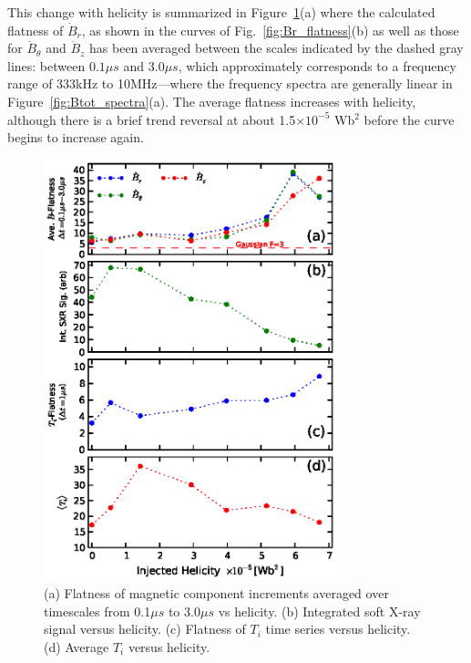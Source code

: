 \documentclass[aps,prl,amsmath,amssymb,reprint,superscriptaddress]{revtex4-1} %
\begin{document}
This change with helicity is summarized in Figure~\ref{fig:flatness_scaling}(a) where the calculated flatness of $\dot{B}_{r}$, as shown in the curves of Fig.~\ref{fig:Br_flatness}(b) as well as those for $\dot{B}_{\theta}$ and $\dot{B}_{z}$ has been averaged between the scales indicated by the dashed gray lines: between $0.1\mu s$ and $3.0\mu s$, which approximately corresponds to a frequency range of 333kHz to 10MHz---where the frequency spectra are generally linear in Figure~\ref{fig:Btot_spectra}(a). The average flatness increases with helicity, although there is a brief trend reversal at about 1.5$\times 10^{-5}$ Wb$^{2}$ before the curve begins to increase again.


\begin{figure}[!htbp]
\centerline{
\includegraphics[width=8.5cm]{figure4.eps}}
\caption{\label{fig:flatness_scaling} (a) Flatness of magnetic component increments averaged over timescales from 0.1$\mu s$ to 3.0$\mu s$ vs helicity. (b) Integrated soft X-ray signal versus helicity. (c) Flatness of $T_{i}$ time series versus helicity. (d) Average $T_{i}$ versus helicity.}
\end{figure}
\end{document}

